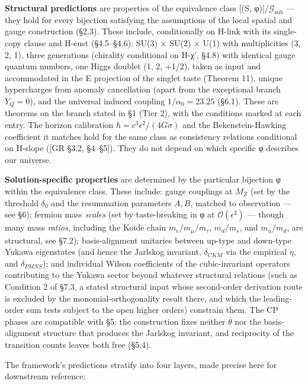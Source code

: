 \documentclass[
]{article}
\begin{document}
\textbf{Structural predictions} are properties of the equivalence class
{[}(S, φ){]}/\(\mathcal{G}_{\text{sub}}\) --- they hold for every
bijection satisfying the assumptions of the local spatial and gauge
construction (§2.3). These include, conditionally on H-link with its
single-copy clause and H-cust (§4.5--§4.6): SU(3) × SU(2) × U(1) with
multiplicities (3, 2, 1), three generations (chirality conditional on
H-χ', §4.8) with identical gauge quantum numbers, one Higgs doublet (1,
2, +1/2), taken as input and accommodated in the E projection of the
singlet taste (Theorem 11), unique hypercharges from anomaly
cancellation (apart from the exceptional branch \(Y_Q=0\)), and the
universal induced coupling \(1/\alpha_0 = 23.25\) (§6.1). These are
theorems on the branch stated in §1 (Tier 2), with the conditions marked
at each entry. The horizon calibration
\(\hbar = c^3\epsilon^2/(4G\sigma)\) and the Bekenstein-Hawking
coefficient it matches hold for the same class as consistency relations
conditional on H-slope ({[}GR §3.2, §4--§5{]}). They do not depend on
which specific φ describes our universe.

\textbf{Solution-specific properties} are determined by the particular
bijection φ within the equivalence class. These include: gauge couplings
at \(M_Z\) (set by the threshold \(\delta_0\) and the resummation
parameters \(A, B\), matched to observation --- see §6); fermion mass
\emph{scales} (set by taste-breaking in φ at \(\mathcal{O}(\epsilon^2)\)
--- though many mass \emph{ratios}, including the Koide chain
\(m_e/m_\mu/m_\tau\), \(m_d/m_s\), and \(m_u/m_d\), are structural, see
§7.2); basis-alignment unitaries between up-type and down-type Yukawa
eigenstates (and hence the Jarlskog invariant, \(\delta_{CKM}\) via the
empirical \(\eta\), and \(\delta_{PMNS}\)); and individual Wilson
coefficients of the cubic-invariant operators contributing to the Yukawa
sector beyond whatever structural relations (such as Condition 2 of
§7.3, a stated structural input whose second-order derivation route is
excluded by the monomial-orthogonality result there, and which the
leading-order sum tests subject to the open higher orders) constrain
them. The CP phases are compatible with §5: the construction fixes
neither \(\bar\theta\) nor the basis-alignment structure that produces
the Jarlskog invariant, and reciprocity of the transition counts leaves
both free (§5.4).

The framework's predictions stratify into four layers, made precise here
for downstream reference:
\end{document}
